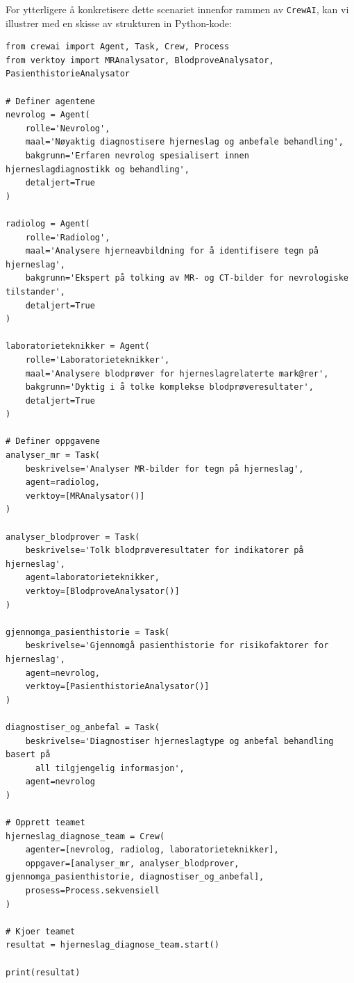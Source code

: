 \noindent For ytterligere å konkretisere dette scenariet innenfor rammen av \texttt{CrewAI}, kan vi illustrer med en skisse av strukturen in Python-kode:

\begin{verbatim}
from crewai import Agent, Task, Crew, Process
from verktoy import MRAnalysator, BlodproveAnalysator, PasienthistorieAnalysator

# Definer agentene
nevrolog = Agent(
    rolle='Nevrolog',
    maal='Nøyaktig diagnostisere hjerneslag og anbefale behandling',
    bakgrunn='Erfaren nevrolog spesialisert innen hjerneslagdiagnostikk og behandling',
    detaljert=True
)

radiolog = Agent(
    rolle='Radiolog',
    maal='Analysere hjerneavbildning for å identifisere tegn på hjerneslag',
    bakgrunn='Ekspert på tolking av MR- og CT-bilder for nevrologiske tilstander',
    detaljert=True
)

laboratorieteknikker = Agent(
    rolle='Laboratorieteknikker',
    maal='Analysere blodprøver for hjerneslagrelaterte mark@rer',
    bakgrunn='Dyktig i å tolke komplekse blodprøveresultater',
    detaljert=True
)

# Definer oppgavene
analyser_mr = Task(
    beskrivelse='Analyser MR-bilder for tegn på hjerneslag',
    agent=radiolog,
    verktoy=[MRAnalysator()]
)

analyser_blodprover = Task(
    beskrivelse='Tolk blodprøveresultater for indikatorer på hjerneslag',
    agent=laboratorieteknikker,
    verktoy=[BlodproveAnalysator()]
)

gjennomga_pasienthistorie = Task(
    beskrivelse='Gjennomgå pasienthistorie for risikofaktorer for hjerneslag',
    agent=nevrolog,
    verktoy=[PasienthistorieAnalysator()]
)

diagnostiser_og_anbefal = Task(
    beskrivelse='Diagnostiser hjerneslagtype og anbefal behandling basert på 
      all tilgjengelig informasjon',
    agent=nevrolog
)

# Opprett teamet
hjerneslag_diagnose_team = Crew(
    agenter=[nevrolog, radiolog, laboratorieteknikker],
    oppgaver=[analyser_mr, analyser_blodprover, gjennomga_pasienthistorie, diagnostiser_og_anbefal],
    prosess=Process.sekvensiell
)

# Kjoer teamet
resultat = hjerneslag_diagnose_team.start()

print(resultat)
\end{verbatim}


